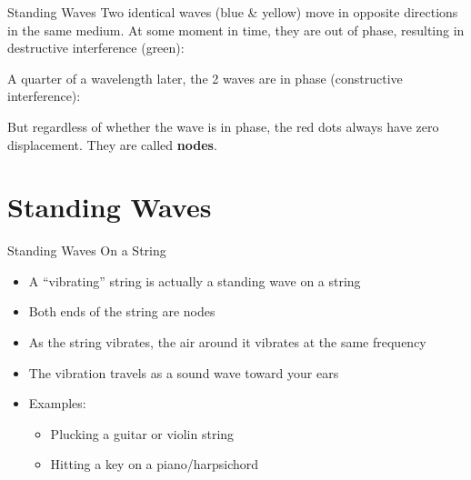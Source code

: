 \documentclass[12pt,aspectratio=169]{beamer}
\begin{document}
\begin{frame}{Standing Waves}
  Two identical waves (blue \& yellow) move in opposite directions in the
  same medium. At some moment in time, they are out of phase, resulting in
  destructive interference (green):
  \begin{center}
  \end{center}
  A quarter of a wavelength later, the 2 waves are in phase (constructive
  interference):
  \begin{center}
  \end{center}
  But regardless of whether the wave is in phase, the red dots always have zero
  displacement. They are called \textbf{nodes}.
\end{frame}



\section{Standing Waves}

\begin{frame}{Standing Waves On a String}
  \begin{itemize}
  \item A ``vibrating'' string is actually a standing wave on a string
  \item Both ends of the string are nodes
  \item As the string vibrates, the air around it vibrates at the same frequency
  \item The vibration travels as a sound wave toward your ears
  \item Examples:
    \begin{itemize}
    \item Plucking a guitar or violin string
    \item Hitting a key on a piano/harpsichord
    \end{itemize}
  \end{itemize}
\end{frame}
\end{document}
